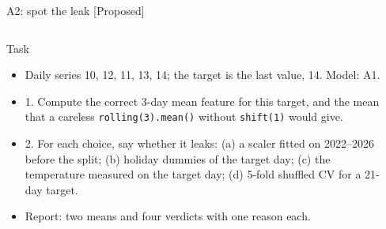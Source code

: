 \begin{frame}{A2: spot the leak [Proposed]}
\propsub
\itemsize{\scriptsize}
\begin{columns}[T]
\begin{column}{\taskw}
\begin{block}{Task}
\begin{itemize}
    \item Daily series 10, 12, 11, 13, 14; the target is the last value, 14. Model: A1.
    \item 1. Compute the correct 3-day mean feature for this target, and the mean that a careless \texttt{rolling(3).mean()} without \texttt{shift(1)} would give.
    \item 2. For each choice, say whether it leaks: (a) a scaler fitted on 2022--2026 before the split; (b) holiday dummies of the target day; (c) the temperature measured on the target day; (d) 5-fold shuffled CV for a 21-day target.
    \item Report: two means and four verdicts with one reason each.
\end{itemize}
\end{block}
\end{column}
\begin{column}{\solw}
\end{column}
\end{columns}
\end{frame}


